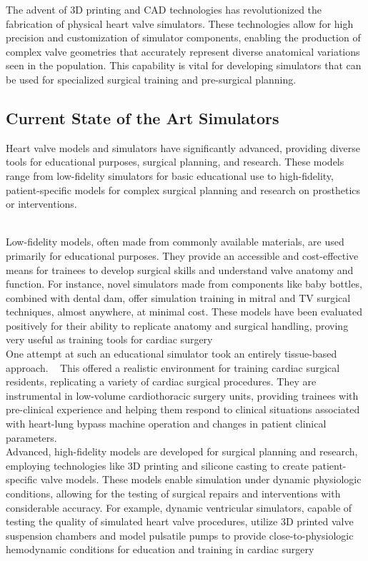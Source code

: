 The advent of 3D printing and \gls{CAD} technologies has revolutionized the fabrication of physical heart valve simulators. These technologies allow for high precision and customization of simulator components, enabling the production of complex valve geometries that accurately represent diverse anatomical variations seen in the population. This capability is vital for developing simulators that can be used for specialized surgical training and pre-surgical planning.

\subsection{Current State of the Art Simulators}

Heart valve models and simulators have significantly advanced, providing diverse tools for educational purposes, surgical planning, and research. These models range from low-fidelity simulators for basic educational use to high-fidelity, patient-specific models for complex surgical planning and research on prosthetics or interventions.

\\
Low-fidelity models, often made from commonly available materials, are used primarily for educational purposes. They provide an accessible and cost-effective means for trainees to develop surgical skills and understand valve anatomy and function. For instance, novel simulators made from components like baby bottles, combined with dental dam, offer simulation training in mitral and \gls{TV} surgical techniques, almost anywhere, at minimal cost. These models have been evaluated positively for their ability to replicate anatomy and surgical handling, proving very useful as training tools for cardiac surgery ~\\

One attempt at such an educational simulator took an entirely tissue-based approach. ~ This offered a realistic environment for training cardiac surgical residents, replicating a variety of cardiac surgical procedures. They are instrumental in low-volume cardiothoracic surgery units, providing trainees with pre-clinical experience and helping them respond to clinical situations associated with heart-lung bypass machine operation and changes in patient clinical parameters.\\

Advanced, high-fidelity models are developed for surgical planning and research, employing technologies like 3D printing and silicone casting to create patient-specific valve models. These models enable simulation under dynamic physiologic conditions, allowing for the testing of surgical repairs and interventions with considerable accuracy. For example, dynamic ventricular simulators, capable of testing the quality of simulated heart valve procedures, utilize 3D printed valve suspension chambers and model pulsatile pumps to provide close-to-physiologic hemodynamic conditions for education and training in cardiac surgery ~\\

